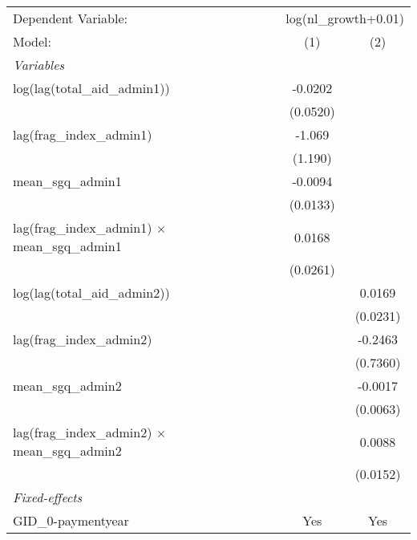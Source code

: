 \begingroup
\centering
\begin{tabular}{lcc}
   \tabularnewline \midrule \midrule
   Dependent Variable: & \multicolumn{2}{c}{log(nl\_growth+0.01)}\\
   Model:                                                   & (1)      & (2)\\  
   \midrule
   \emph{Variables}\\
   log(lag(total\_aid\_admin1))                             & -0.0202  &   \\   
                                                            & (0.0520) &   \\   
   lag(frag\_index\_admin1)                                 & -1.069   &   \\   
                                                            & (1.190)  &   \\   
   mean\_sgq\_admin1                                        & -0.0094  &   \\   
                                                            & (0.0133) &   \\   
   lag(frag\_index\_admin1) $\times$ mean\_sgq\_admin1      & 0.0168   &   \\   
                                                            & (0.0261) &   \\   
   log(lag(total\_aid\_admin2))                             &          & 0.0169\\   
                                                            &          & (0.0231)\\   
   lag(frag\_index\_admin2)                                 &          & -0.2463\\   
                                                            &          & (0.7360)\\   
   mean\_sgq\_admin2                                        &          & -0.0017\\   
                                                            &          & (0.0063)\\   
   lag(frag\_index\_admin2) $\times$ mean\_sgq\_admin2      &          & 0.0088\\   
                                                            &          & (0.0152)\\   
   \midrule
   \emph{Fixed-effects}\\
   GID\_0-paymentyear                                       & Yes      & Yes\\  

\end{tabular}
